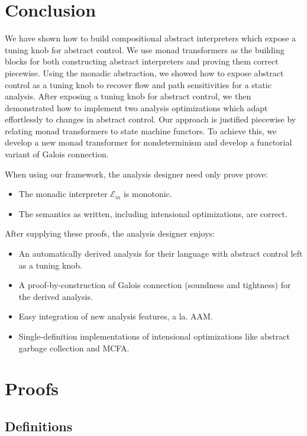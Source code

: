 \documentclass{article}
\begin{document}

\section{Conclusion}
\label{Conclusion}

We have shown how to build compositional abstract interpreters which expose a tuning knob for abstract control.
We use monad transformers as the building blocks for both constructing abstract interpreters and proving them correct piecewise.
Using the monadic abstraction, we showed how to expose abstract control as a tuning knob to recover flow and path sensitivities 
  for a static analysis.
After exposing a tuning knob for abstract control, we then demonstrated how to implement two analysis optimizations which adapt effortlessly to changes in abstract control.
Our approach is justified piecewise by relating monad transformers to state machine functors.
To achieve this, we develop a new monad transformer for nondeterminism and develop a functorial variant of Galois connection.

When using our framework, the analysis designer need only prove prove:
\begin{itemize}
\item The monadic interpreter $ℰ_{m}$ is monotonic.
\item The semantics as written, including intensional optimizations, are correct.
\end{itemize}
After supplying these proofs, the analysis designer enjoys:
\begin{itemize}
\item An automatically derived analysis for their language with abstract control left as a tuning knob.
\item A proof-by-construction of Galois connection (soundness and tightness) for the derived analysis.
\item Easy integration of new analysis features, a la. AAM.
\item Single-definition implementations of intensional optimizations like abstract garbage collection and MCFA.
\end{itemize}


\section{Proofs}
\label{Proofs}

\subsection{Definitions}
\label{Definitions}
\end{document}
